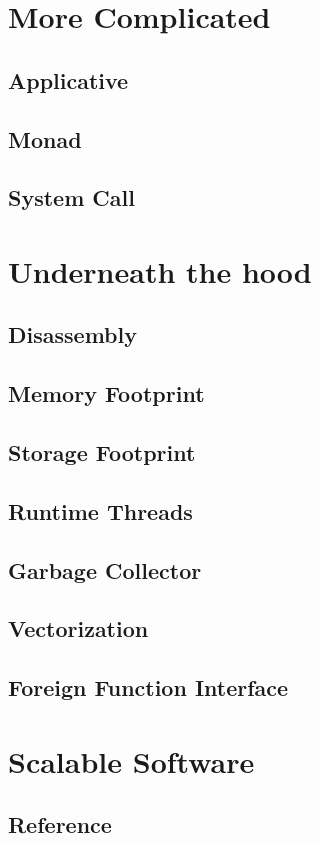 \documentclass{kdp}
\begin{document}
\part{More Complicated}

\chapter{Applicative}

\chapter{Monad}

\chapter{System Call}

\part{Underneath the hood}

\chapter{Disassembly}

\chapter{Memory Footprint}

\chapter{Storage Footprint}

\chapter{Runtime Threads}

\chapter{Garbage Collector}

\chapter{Vectorization}

\chapter{Foreign Function Interface}

\part{Scalable Software}

\chapter{Reference}
\end{document}
